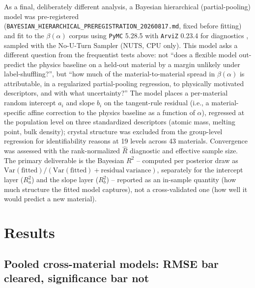 \documentclass[aip,amsmath,amssymb,reprint]{revtex4-1}
\begin{document}
As a final, deliberately different analysis, a Bayesian hierarchical
(partial-pooling) model was pre-registered
(\texttt{BAYESIAN\_HIERARCHICAL\_PREREGISTRATION\_20260817.md}, fixed
before fitting) and fit to the $\beta(\alpha)$ corpus using
\texttt{PyMC} 5.28.5 with \texttt{ArviZ} 0.23.4 for diagnostics
\citep{salvatier2016pymc3}, sampled with the No-U-Turn Sampler (NUTS,
CPU only). This model asks a different question from the frequentist
tests above: not ``does a flexible model out-predict the physics
baseline on a held-out material by a margin unlikely under
label-shuffling?'', but ``how much of the material-to-material spread
in $\beta(\alpha)$ is attributable, in a regularized partial-pooling
regression, to physically motivated descriptors, and with what
uncertainty?'' The model places a per-material random intercept
$a_i$ and slope $b_i$ on the tangent-rule residual (i.e., a
material-specific affine correction to the physics baseline as a
function of $\alpha$), regressed at the population level on three
standardized descriptors (atomic mass, melting point, bulk density);
crystal structure was excluded from the group-level regression for
identifiability reasons at 19 levels across 43 materials. Convergence
was assessed with the rank-normalized $\hat{R}$ diagnostic
\citep{vehtari2021rhat} and effective sample size. The primary
deliverable is the Bayesian $R^2$
\citep{gelman2019r2} -- computed per posterior draw as
$\mathrm{Var}(\mathrm{fitted})/(\mathrm{Var}(\mathrm{fitted}) +
\mathrm{residual\ variance})$, separately for the intercept layer
($R^2_a$) and the slope layer ($R^2_b$) -- reported as an in-sample
quantity (how much structure the fitted model captures), not a
cross-validated one (how well it would predict a new material).

\section{Results}
\label{sec:results}

\subsection{Pooled cross-material models: RMSE bar cleared, significance bar not}
\label{ssec:pooled}
\end{document}
